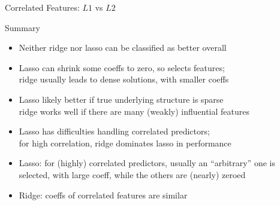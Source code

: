 \documentclass[11pt,compress,t,notes=noshow, xcolor=table]{beamer}
\begin{document}
\begin{vbframe}{Correlated Features: $L1$ vs $L2$}
\framebreak



\end{vbframe}


\begin{vbframe}{Summary  }

\begin{itemize}
\item Neither ridge nor lasso can be classified as better overall
\item Lasso can shrink some coeffs to zero, so selects features; \\
ridge usually leads to dense solutions, with smaller coeffs
\item Lasso likely better if true underlying structure is sparse \\
ridge works well if there are many (weakly) influential features
\item Lasso has difficulties handling correlated predictors; \\
for high correlation, ridge dominates lasso in performance
\item Lasso: for (highly) correlated predictors, usually an ``arbitrary'' one is selected, with large coeff, while the others are (nearly) zeroed
\item Ridge: coeffs of correlated features are similar
\end{itemize}

\end{vbframe}

\endlecture
\end{document}
